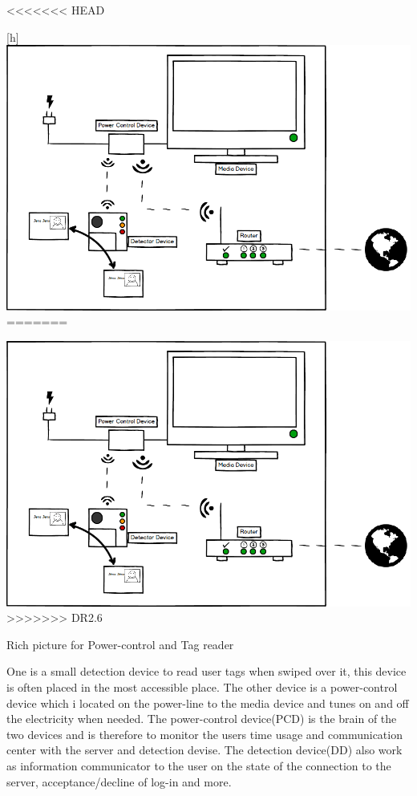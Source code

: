 <<<<<<< HEAD
\begin{center}[h]
	\centering
		\includegraphics[width=1.00\textwidth]{images/Power&Tagdevice.png}
=======
\begin{center}
	\includegraphics[width=1.00\textwidth]{images/Power&Tagdevice.png}	
>>>>>>> DR2.6
	\caption{Rich picture for Power-control and Tag reader}
	\label{fig:Power&Tagdevice}
\end{center}

One is a small detection device to read user tags when swiped over it, this device is often placed in the most accessible place. \newline
The other device is a power-control device which i located on the power-line to the media device and tunes on and off the electricity when needed.\newline
The power-control device(PCD) is the brain of the two devices and is therefore to monitor the users time usage and communication center with the server and detection devise. \newline
The detection device(DD) also work as information communicator to the user on the state of the connection to the server, acceptance/decline of log-in and more. \newline    


\end{center}
